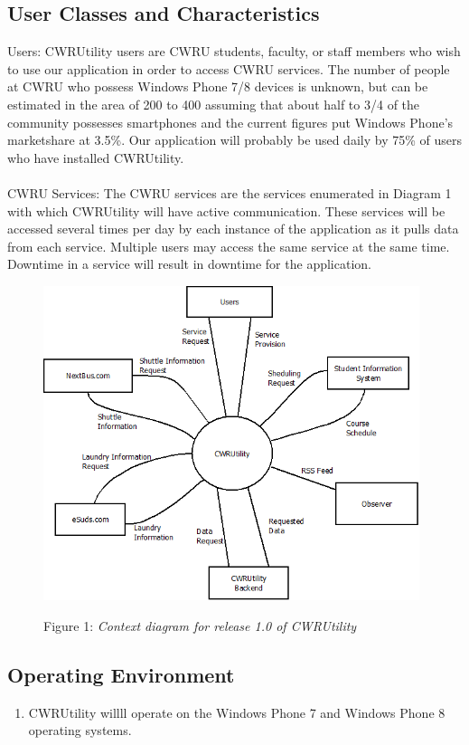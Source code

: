 \documentclass[pdftex,12pt,letter]{article}
\begin{document}
\subsection{User Classes and Characteristics}
\noindent Users: CWRUtility users are CWRU students, faculty, or staff members who wish to use our application in order to access CWRU services. The number of people at CWRU who possess Windows Phone 7/8 devices is unknown, but can be estimated in the area of 200 to 400 assuming that about half to 3/4 of the community possesses smartphones and the current figures put Windows Phone's marketshare at 3.5\%. Our application will probably be used daily by 75\% of users who have installed CWRUtility.\\\\
CWRU Services:  The CWRU services are the services enumerated in Diagram 1 with which CWRUtility will have active communication. These services will be accessed several times per day by each instance of the application as it pulls data from each service. Multiple users may access the same service at the same time. Downtime in a service will result in downtime for the application.
\begin{figure}[h]
\begin{center}
\includegraphics[width=110mm]{ContextDiagram.png}\\
\caption{Figure 1: \emph{Context diagram for release 1.0 of CWRUtility}}
\end{center}
\end{figure}
\subsection{Operating Environment}
\begin{enumerate}[{O}E-1:]
\item CWRUtility willll operate on the Windows Phone 7 and Windows Phone 8 operating systems.
\end{enumerate}
\end{document}
